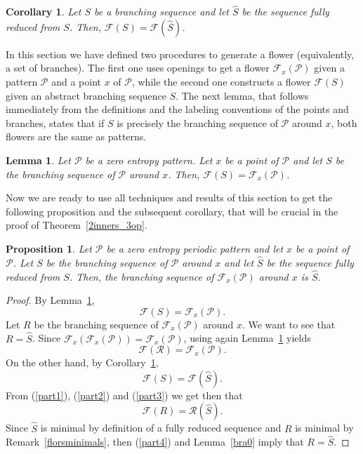 \documentclass[a4paper]{amsart}
\newtheorem{proposition}[theorem]{Proposition}
\newtheorem{lemma}[theorem]{Lemma}
\newtheorem{corollary}[theorem]{Corollary}
\theoremstyle{definition}
\begin{document}
\begin{corollary}\label{bra2}
Let $S$ be a branching sequence and let $\widehat{S}$ be the sequence fully reduced from $S$. Then, $\mathcal{F}(S)=\mathcal{F}(\widehat{S})$.
\end{corollary}

In this section we have defined two procedures to generate a flower (equivalently, a set of branches). The first one uses openings to get a flower
$\mathcal{F}_{x}(\mathcal{P})$ given a pattern $\mathcal{P}$ and a point $x$ of $\mathcal{P}$, while the second one constructs a flower $\mathcal{F}(S)$ given an abstract branching sequence $S$. The next lemma, that follows immediately from the definitions and the labeling conventions of the points and branches, states that if $S$ is precisely the branching sequence of $\mathcal{P}$ around $x$, both flowers are the same as patterns.

\begin{lemma}\label{bra3}
Let $\mathcal{P}$ be a zero entropy pattern. Let $x$ be a point of $\mathcal{P}$ and let $S$ be the branching sequence of $\mathcal{P}$ around $x$. Then, $\mathcal{F}(S)=\mathcal{F}_{x}(\mathcal{P})$.
\end{lemma}

Now we are ready to use all techniques and results of this section to get the following proposition and the subsequent corollary, that will be crucial in the proof of Theorem~\ref{2inners_3op}.

\begin{proposition}\label{newresult}
Let $\mathcal{P}$ be a zero entropy periodic pattern and let $x$ be a point of $\mathcal{P}$. Let $S$ be the branching sequence of $\mathcal{P}$ around $x$ and let $\widehat{S}$ be the sequence fully reduced from $S$. Then, the branching sequence of $\mathcal{F}_x(\mathcal{P})$ around $x$ is $\widehat{S}$.
\end{proposition}
\begin{proof}
By Lemma~\ref{bra3},
\begin{equation}\label{part1}
\mathcal{F}(S)=\mathcal{F}_x(\mathcal{P}).
\end{equation}
Let $R$ be the branching sequence of $\mathcal{F}_x(\mathcal{P})$ around $x$. We want to see that $R=\widehat{S}$. Since $\mathcal{F}_x(\mathcal{F}_x(\mathcal{P}))=\mathcal{F}_x(\mathcal{P})$, using again Lemma~\ref{bra3} yields
\begin{equation}\label{part2}
\mathcal{F}(\mathcal{R})=\mathcal{F}_x(\mathcal{P}).
\end{equation}
On the other hand, by Corollary~\ref{bra2},
\begin{equation}\label{part3}
\mathcal{F}(S)=\mathcal{F}(\widehat{S}).
\end{equation}
From (\ref{part1}), (\ref{part2}) and (\ref{part3}) we get then that
\begin{equation}\label{part4}
\mathcal{F}(R)=\mathcal{R}(\widehat{S}).
\end{equation}
Since $\widehat{S}$ is minimal by definition of a fully reduced sequence and $R$ is minimal by Remark~\ref{florsminimals}, then (\ref{part4}) and Lemma~\ref{bra0} imply that $R=\widehat{S}$.
\end{proof}
\end{document}
